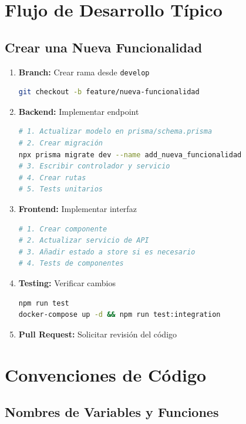 \documentclass[a4paper]{report}
\begin{document}
\section{Flujo de Desarrollo Típico}

\subsection{Crear una Nueva Funcionalidad}

\begin{enumerate}
  \item \textbf{Branch:} Crear rama desde \texttt{develop}
  \begin{lstlisting}[language=bash]
git checkout -b feature/nueva-funcionalidad
  \end{lstlisting}
  
  \item \textbf{Backend:} Implementar endpoint
  \begin{lstlisting}[language=bash]
# 1. Actualizar modelo en prisma/schema.prisma
# 2. Crear migración
npx prisma migrate dev --name add_nueva_funcionalidad
# 3. Escribir controlador y servicio
# 4. Crear rutas
# 5. Tests unitarios
  \end{lstlisting}
  
  \item \textbf{Frontend:} Implementar interfaz
  \begin{lstlisting}[language=bash]
# 1. Crear componente
# 2. Actualizar servicio de API
# 3. Añadir estado a store si es necesario
# 4. Tests de componentes
  \end{lstlisting}
  
  \item \textbf{Testing:} Verificar cambios
  \begin{lstlisting}[language=bash]
npm run test
docker-compose up -d && npm run test:integration
  \end{lstlisting}
  
  \item \textbf{Pull Request:} Solicitar revisión del código
\end{enumerate}

\section{Convenciones de Código}

\subsection{Nombres de Variables y Funciones}
\end{document}

